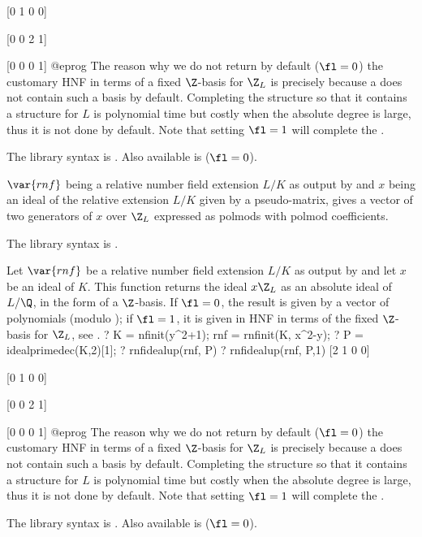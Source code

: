 [0 1 0 0]

[0 0 2 1]

[0 0 0 1]
@eprog
The reason why we do not return by default ($\fl = 0$) the customary HNF in
terms of a fixed $\Z$-basis for $\Z_L$ is precisely because
a  does not contain such a basis by default. Completing the
structure so that it contains a  structure for $L$ is polynomial
time but costly when the absolute degree is large, thus it is not done by
default. Note that setting $\fl = 1$ will complete the .

The library syntax is .
Also available is
 ($\fl = 0$).

\label{se:rnfidealtwoelt}
$\var{rnf}$ being a relative
number field extension $L/K$ as output by  and $x$ being an
ideal of the relative extension $L/K$ given by a pseudo-matrix, gives a
vector of two generators of $x$ over $\Z_L$ expressed as polmods with polmod
coefficients.

The library syntax is .

\label{se:rnfidealup}
Let $\var{rnf}$ be a relative number
field extension $L/K$ as output by  and let $x$ be an ideal of
$K$. This function returns the ideal $x\Z_L$ as an absolute ideal of $L/\Q$,
in the form of a $\Z$-basis. If $\fl = 0$, the result is given by a vector of
polynomials (modulo ); if $\fl = 1$, it is given in HNF in terms
of the fixed $\Z$-basis for $\Z_L$, see .
\bprog
? K = nfinit(y^2+1); rnf = rnfinit(K, x^2-y);
? P = idealprimedec(K,2)[1];
? rnfidealup(rnf, P)
? rnfidealup(rnf, P,1)
[2 1 0 0]

[0 1 0 0]

[0 0 2 1]

[0 0 0 1]
@eprog
The reason why we do not return by default ($\fl = 0$) the customary HNF in
terms of a fixed $\Z$-basis for $\Z_L$ is precisely because
a  does not contain such a basis by default. Completing the
structure so that it contains a  structure for $L$ is polynomial
time but costly when the absolute degree is large, thus it is not done by
default. Note that setting $\fl = 1$ will complete the .

The library syntax is .
Also available is
  ($\fl = 0$).

